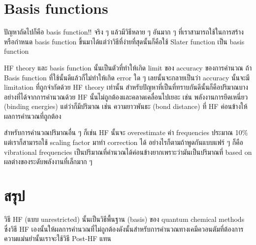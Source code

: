 \section{Basis functions}

ปัญหาถัดไปก็คือ basis function!! จริง ๆ แล้วมีวิธีหลาย ๆ อันมาก ๆ ที่เราสามารถใช้ในการสร้างหรือกำหนด
basis function ขึ้นมาได้แต่ว่าวิธีที่ง่ายที่สุดนั้นก็คือใช้ Slater function เป็น basis function

HF theory และ basis function นั้นเป็นตัวที่ทำให้เกิด limit ของ accuracy ของการคำนวณ ถ้า Basis
function ที่ใช้นั้นดีแล้วก็ไม่ทำให้เกิด error ใด ๆ เลยนั้นจะกลายเป็นว่า accuracy นั้นจะมี limitation
ที่ถูกจำกัดด้วย HF theory เท่านั้น สำหรับปัญหาที่เป็นที่ทราบกันดีนั้นก็คือปริมาณบางอย่างที่ได้จากการคำนวณด้วย HF
นั้นไม่ถูกต้องและคลาดเคลื่อนไปเยอะ เช่น พลังงานการยึดเหนี่ยว (binding energies) แต่ว่าก็มีปริมาณ 
เช่น ความยาวพันธะ (bond distance) ที่ HF ค่อนข้างให้ผลการคำนวณที่ถูกต้อง

สำหรับการคำนวณปริมาณอื่น ๆ ก็เช่น HF นั้นจะ overestimate ค่า frequencies ประมาณ 10\% แต่เราก็สามารถใช้
scaling factor มาทำ correction ได้ อย่างไรก็ตามถ้าพูดกันแบบแฟร์ ๆ ก็คือ vibrational frequencies
เป็นปริมาณที่คำนวณได้ค่อนข้างยากเพราะว่ามันเป็นปริมาณที่ based on ผลต่างของระดับพลังงานที่เล็กมาก ๆ

\section{สรุป}

วิธี HF (แบบ unrestricted) นั้นเป็นวิธีพื้นฐาน (basis) ของ quantum chemical methods ซึ่งวิธี HF
เองนั้นให้ผลการคำนวณที่ไม่ถูกต้องดังนั้นสำหรับการคำนวณทางเคมีควอนตัมที่ต้องการความแม่นยำนั้นเราจะใช้วิธี
Post-HF แทน
